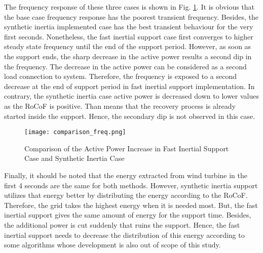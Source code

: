 The frequency response of these three cases is shown in Fig. \ref{Comp_freq}. It is obvious that the base case frequency response has the poorest transient frequency. Besides, the synthetic inertia implemented case has the best transient behaviour for the very first seconds. Nonetheless, the fast inertial support case first converges to higher steady state frequency until the end of the support period. However, as soon as the support ends, the sharp decrease in the active power results a second dip in the frequency. The decrease in the active power can be considered as a second load connection to system. Therefore, the frequency is exposed to a second decrease at the end of support period in fast inertial support implementation. In contrary, the synthetic inertia case active power is decreased down to lower values as the RoCoF is positive. Than means that the recovery process is already started inside the support. Hence, the secondary dip is not observed in this case. \par
\begin{figure}[h!]
	\centering
	\texttt{[image: comparison\_freq.png]}
	\caption{Comparison of the Active Power Increase in Fast Inertial Support Case and Synthetic Inertia Case}
	\label{Comp_freq}
\end{figure}
Finally, it should be noted that the energy extracted from wind turbine in the first 4 seconds are the same for both methods. However, synthetic inertia support utilizes that energy better by distributing the energy according to the RoCoF. Therefore, the grid takes the highest energy when it is needed most. But, the fast inertial support gives the same amount of energy for the support time. Besides, the additional power is cut suddenly that ruins the support. Hence, the fast inertial support needs to decrease the distribution of this energy according to some algorithms whose development is also out of scope of this study.